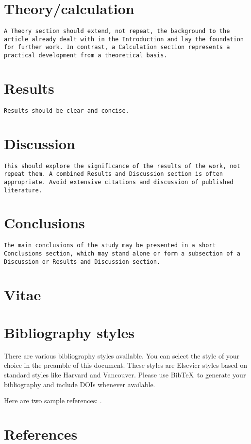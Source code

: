 \documentclass[review]{elsarticle}
\begin{document}
\section{Theory/calculation} 
\texttt{A Theory section should extend, not repeat, the background to the article already dealt with in the Introduction and lay the foundation for further work. In contrast, a Calculation section represents a practical development from a theoretical basis.}

\section{Results} 
\texttt{Results should be clear and concise.}

\section{Discussion} 
\texttt{This should explore the significance of the results of the work, not repeat them. A combined Results and Discussion section is often appropriate. Avoid extensive citations and discussion of published literature.}

\section{Conclusions} 
\texttt{The main conclusions of the study may be presented in a short Conclusions section, which may stand alone or form a subsection of a Discussion or Results and Discussion section.}

\section{Vitae} 




\section{Bibliography styles}

There are various bibliography styles available. You can select the style of your choice in the preamble of this document. These styles are Elsevier styles based on standard styles like Harvard and Vancouver. Please use Bib\TeX\ to generate your bibliography and include DOIs whenever available.

Here are two sample references: \cite{Feynman1963118,Dirac1953888}.

\section*{References}


\end{document}
